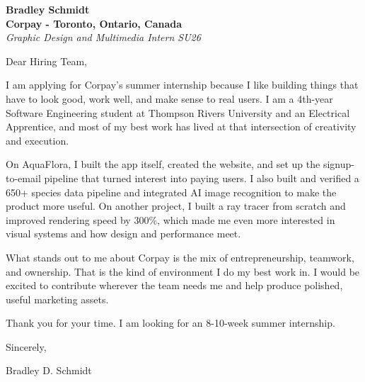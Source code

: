 \documentclass[11pt]{article}
\begin{document}
\textbf{Bradley Schmidt}\\
\vspace{0.5em}
\textbf{Corpay - Toronto, Ontario, Canada}\\
\textit{Graphic Design and Multimedia Intern SU26}

Dear Hiring Team,

\par

I am applying for Corpay's summer internship because I like building things that have to look good, work well, and make sense to real users. I am a 4th-year Software Engineering student at Thompson Rivers University and an Electrical Apprentice, and most of my best work has lived at that intersection of creativity and execution.

\par

On AquaFlora, I built the app itself, created the website, and set up the signup-to-email pipeline that turned interest into paying users. I also built and verified a 650+ species data pipeline and integrated AI image recognition to make the product more useful. On another project, I built a ray tracer from scratch and improved rendering speed by 300\%, which made me even more interested in visual systems and how design and performance meet.

\par

What stands out to me about Corpay is the mix of entrepreneurship, teamwork, and ownership. That is the kind of environment I do my best work in. I would be excited to contribute wherever the team needs me and help produce polished, useful marketing assets.

\par

Thank you for your time. I am looking for an 8-10-week summer internship.

\par

Sincerely,

\par

Bradley D. Schmidt
\end{document}
